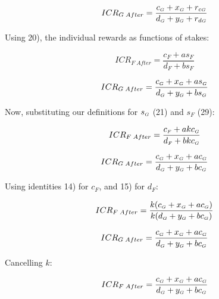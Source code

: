 \documentclass[reqno]{article}
\begin{document}
\begin{equation} 
    ICR_{G \; After}=\frac{c_\mathsmaller{G}+x_\mathsmaller{G}+r_{c\mathsmaller{G}}}{d_\mathsmaller{G}+y_\mathsmaller{G}+r_{d\mathsmaller{G}}}
\end{equation}

\bigskip
Using 20), the individual rewards as functions of stakes:

\begin{equation} 
    ICR_{F \; After}=\frac{c_F+as_F}{d_F+bs_F}
\end{equation}

\begin{equation} 
    ICR_{G \; After}=\frac{c_\mathsmaller{G}+x_\mathsmaller{G}+as_\mathsmaller{G}}{d_\mathsmaller{G}+y_\mathsmaller{G}+bs_\mathsmaller{G}}
\end{equation}

\bigskip
Now, substituting our definitions for $s_\mathsmaller{G}$ (21) and $s_F$ (29):

\begin{equation} 
    ICR_{F \; After}=\frac{c_\mathsmaller{F}+akc_\mathsmaller{G}}{d_\mathsmaller{F}+bkc_\mathsmaller{G}}
\end{equation}

\begin{equation} 
    ICR_{G \; After}=\frac{c_\mathsmaller{G}+x_\mathsmaller{G}+ac_\mathsmaller{G}}{d_\mathsmaller{G}+y_\mathsmaller{G}+bc_\mathsmaller{G}}
\end{equation}

\bigskip
Using identities 14) for $c_F$, and 15) for $d_F$:

\begin{equation} 
    ICR_{F \; After}=\frac{k(c_\mathsmaller{G} + x_\mathsmaller{G}+ac_\mathsmaller{G})}{k(d_\mathsmaller{G}+y_\mathsmaller{G}+bc_\mathsmaller{G})}
\end{equation}

\begin{equation} 
    ICR_{G \; After}=\frac{c_\mathsmaller{G}+x_\mathsmaller{G}+ac_\mathsmaller{G}}{d_\mathsmaller{G}+y_\mathsmaller{G}+bc_\mathsmaller{G}}
\end{equation}

\bigskip
Cancelling $k$:

\begin{equation} 
        ICR_{F \; After}=\frac{c_\mathsmaller{G} + x_\mathsmaller{G}+ac_\mathsmaller{G}}{d_\mathsmaller{G}+y_\mathsmaller{G}+bc_\mathsmaller{G}}
\end{equation}
\end{document}

